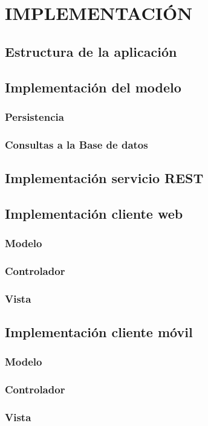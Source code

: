 \chapter[Implementación]{
  \label{chp:implementacion}
  IMPLEMENTACIÓN
}
\thispagestyle{numberingStyle}
\pagestyle{numberingStyle}


\section{Estructura de la aplicación}

\section{Implementación del modelo}
\subsection{Persistencia}
\subsection{Consultas a la Base de datos}
\section{Implementación servicio REST}
\section{Implementación cliente web}
\subsection{Modelo}
\subsection{Controlador}
\subsection{Vista}
\section{Implementación cliente móvil}
\subsection{Modelo}
\subsection{Controlador}
\subsection{Vista}